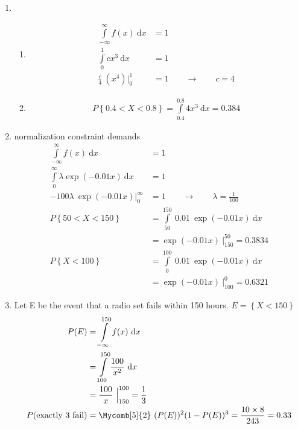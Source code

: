 \begin{enumerate}
\begin{enumerate}
	\end{enumerate}
	
	\item 
	
		\begin{enumerate}
			\item \begin{align}
				\int\limits_{-\infty}^{\infty} f(x)\ \mathrm{d}x &= 1 \nonumber \\
				\int\limits_{0}^{1} c x^3\ \mathrm{d}x &= 1 \nonumber\\
				\frac{c}{4}\ (x^4) \Big|_0^1 &= 1 \qquad \to \qquad c = 4
			\end{align}
			
			\item \begin{align}
				P \left\{0.4 < X < 0.8 \right\} = \int\limits_{0.4}^{0.8} 4 x^3\ \mathrm{d}x = 0.384
			\end{align}
		\end{enumerate}
	
	
	\item normalization constraint demands \\
	
		\begin{align}
			\int\limits_{-\infty}^{\infty} f(x)\ \mathrm{d}x &= 1 \nonumber \\
			\int\limits_{0}^{\infty} \lambda \exp(-0.01x)\ \mathrm{d}x &= 1 \nonumber\\
			-100 \lambda \ \exp(-0.01x) \Big|_0^\infty &= 1 \qquad \to \qquad \lambda = \frac{1}{100} \\
			P \left\{50 < X < 150 \right\} &= \int\limits_{50}^{150}\ 0.01\ \exp(-0.01x)\ \mathrm{d}x \nonumber \\
			&= \exp(-0.01x)\ \Big|_{150}^{50} = 0.3834 \\
			P \left\{X < 100 \right\} &= \int\limits_{0}^{100}\ 0.01\ \exp(-0.01x)\ \mathrm{d}x \nonumber \\
			&= \exp(-0.01x)\ \Big|_{100}^{0} = 0.6321
		\end{align}
	
	
	\item Let E be the event that a radio set fails within 150 hours. $ E = \left\{ X < 150 \right\} $ \\
	
		\begin{align}
			P(E) &= \int\limits_{-\infty}^{150} f(x) \ \mathrm{d}x \nonumber\\
			&= \int\limits_{100}^{150} \frac{100}{x^2} \ \mathrm{d}x \nonumber\\
			&= \frac{100}{x}\ \Big|_{150}^{100} = \frac{1}{3} \\
			P(\text{exactly 3 fail}) &= \Mycomb[5]{2} \ (P(E))^2 (1 - P(E))^3 = \frac{10 \times 8}{243} = 0.33
		\end{align}
	

\end{enumerate}
